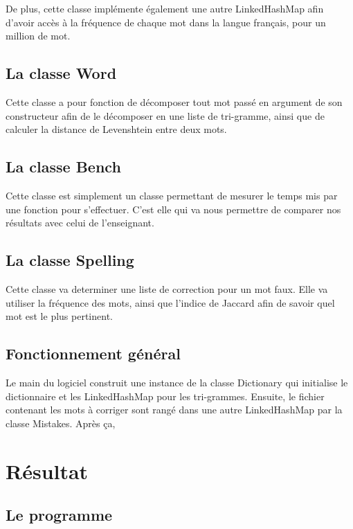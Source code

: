 \documentclass[french,12pt,a4]{report}
\begin{document}
De plus, cette classe implémente également une autre LinkedHashMap afin d'avoir accès à la fréquence de chaque mot dans la langue français, pour un million de mot. 

\section{La classe Word}

Cette classe a pour fonction de décomposer tout mot passé en argument
de son constructeur afin de le décomposer en une liste de tri-gramme,
ainsi que de calculer la distance de Levenshtein entre deux mots.

\section{La classe Bench}

Cette classe est simplement un classe permettant de mesurer le temps
mis par une fonction pour s'effectuer. C'est elle qui va nous
permettre de comparer nos résultats avec celui de l'enseignant.\\

\section{La classe Spelling}

Cette classe va determiner une liste de correction pour un mot
faux. Elle va utiliser la fréquence des mots, ainsi que l'indice de
Jaccard afin de savoir quel mot est le plus pertinent.

\section{Fonctionnement général}


Le main du logiciel construit une instance de la classe Dictionary qui
initialise le dictionnaire et les LinkedHashMap pour les
tri-grammes. Ensuite, le fichier contenant les mots à corriger sont
rangé dans une autre LinkedHashMap par la classe Mistakes. 
Après ça, 

\chapter{Résultat}

\section{Le programme}
\end{document}
